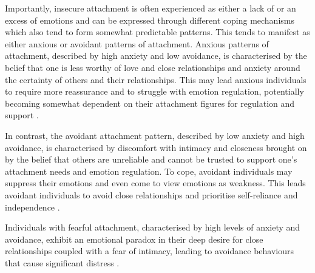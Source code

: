 \documentclass[12pt]{report}
\begin{document}
Importantly, insecure attachment is often experienced as either a lack of or an excess of emotions and can be expressed through different coping mechanisms which also tend to form somewhat predictable patterns.
This tends to manifest as either anxious or avoidant patterns of attachment. Anxious patterns of attachment, described by high anxiety and low avoidance, is characterised by the belief that one is less worthy of love and close relationships and anxiety around the certainty of others and their relationships.
This may lead anxious individuals to require more reassurance and to struggle with emotion regulation, potentially becoming somewhat dependent on their attachment figures for regulation and support \cite{Hudson2020}.

In contrast, the avoidant attachment pattern, described by low anxiety and high avoidance, is characterised by discomfort with intimacy and closeness brought on by the belief that others are unreliable and cannot be trusted to support one's attachment needs and emotion regulation.
To cope, avoidant individuals may suppress their emotions and even come to view emotions as weakness.
This leads avoidant individuals to avoid close relationships and prioritise self-reliance and independence \cite{Mikulincer2013,Hudson2020}.

Individuals with fearful attachment, characterised by high levels of anxiety and avoidance, exhibit an emotional paradox in their deep desire for close relationships coupled with a fear of intimacy, leading to avoidance behaviours that cause significant distress \cite{Bartholomew1991}.
\end{document}
